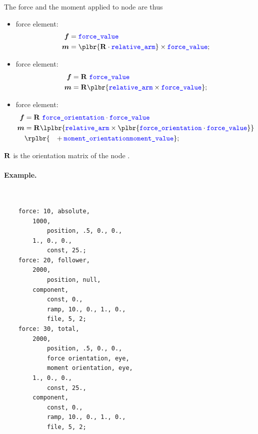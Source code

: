 The force and the moment applied to node  are thus
\begin{itemize}
\item {} force element:
\begin{subequations}
\begin{align}
	\T{f} & = \nt{force\_value} \\
	\T{m} & = \plbr{\TT{R} \cdot \nt{relative\_arm}} \times \nt{force\_value} ;
\end{align}
\end{subequations}

\item {} force element:
\begin{subequations}
\begin{align}
	\T{f} & = \TT{R} \ \nt{force\_value} \\
	\T{m} & = \TT{R} \plbr{\nt{relative\_arm} \times \nt{force\_value}} ;
\end{align}
\end{subequations}

\item {} force element:
\begin{subequations}
\begin{align}
	\T{f} & = \TT{R} \ \nt{force\_orientation} \cdot \nt{force\_value} \\
	\T{m} & = \TT{R} \lplbr{
		\nt{relative\_arm} \times \plbr{ \nt{force\_orientation} \cdot \nt{force\_value}}
	} \nonumber \\
	& \rplbr{\hphantom{= } \mbox{} +
		\nt{moment\_orientation} \nt{moment\_value}
	};
\end{align}
\end{subequations}

\end{itemize}
$\bm{\mathbf R}$ is the orientation matrix of the node .

\paragraph{Example.} \
\begin{verbatim}
    force: 10, absolute,
        1000,
            position, .5, 0., 0.,
        1., 0., 0.,
            const, 25.;
    force: 20, follower,
        2000,
            position, null,
        component,
            const, 0.,
            ramp, 10., 0., 1., 0.,
            file, 5, 2;
    force: 30, total,
        2000,
            position, .5, 0., 0.,
            force orientation, eye,
            moment orientation, eye,
        1., 0., 0.,
            const, 25.,
        component,
            const, 0.,
            ramp, 10., 0., 1., 0.,
            file, 5, 2;
\end{verbatim}
